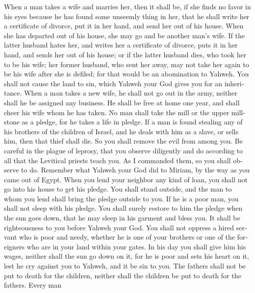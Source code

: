 \begin{paracol}{2}
\begin{otherlanguage}{english}
 When a man takes a wife and marries her, then it shall
be, if she finds no favor in his eyes because he has found some unseemly
thing in her, that he shall write her a certificate of divorce, put it
in her hand, and send her out of his house.  When she has
departed out of his house, she may go and be another man's wife.
 If the latter husband hates her, and writes her a
certificate of divorce, puts it in her hand, and sends her out of his
house; or if the latter husband dies, who took her to be his wife;
 her former husband, who sent her away, may not take her
again to be his wife after she is defiled; for that would be an
abomination to Yahweh. You shall not cause the land to sin, which Yahweh
your God gives you for an inheritance.  When a man takes a
new wife, he shall not go out in the army, neither shall he be assigned
any business. He shall be free at home one year, and shall cheer his
wife whom he has taken.  No man shall take the mill or the
upper millstone as a pledge, for he takes a life in pledge.
 If a man is found stealing any of his brothers of the
children of Israel, and he deals with him as a slave, or sells him, then
that thief shall die. So you shall remove the evil from among you.
 Be careful in the plague of leprosy, that you observe
diligently and do according to all that the Levitical priests teach you.
As I commanded them, so you shall observe to do.  Remember
what Yahweh your God did to Miriam, by the way as you came out of Egypt.
 When you lend your neighbor any kind of loan, you shall
not go into his house to get his pledge.  You shall stand
outside, and the man to whom you lend shall bring the pledge outside to
you.  If he is a poor man, you shall not sleep with his
pledge.  You shall surely restore to him the pledge when
the sun goes down, that he may sleep in his garment and bless you. It
shall be righteousness to you before Yahweh your God. 
You shall not oppress a hired servant who is poor and needy, whether he
is one of your brothers or one of the foreigners who are in your land
within your gates.  In his day you shall give him his
wages, neither shall the sun go down on it, for he is poor and sets his
heart on it, lest he cry against you to Yahweh, and it be sin to you.
 The fathers shall not be put to death for the children,
neither shall the children be put to death for the fathers. Every man

\end{otherlanguage}
\end{paracol}
